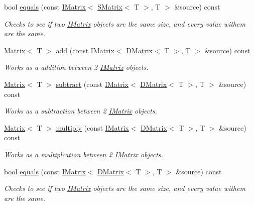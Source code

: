 \begin{DoxyCompactItemize}
bool \mbox{\hyperlink{class_matrix_a10dabe69f447e230871ecc91cbced548}{equals}} (const \mbox{\hyperlink{class_i_matrix}{I\+Matrix}}$<$ \mbox{\hyperlink{class_s_matrix}{S\+Matrix}}$<$ T $>$, T $>$ \&source) const
\begin{DoxyCompactList}\small\item\em Checks to see if two \mbox{\hyperlink{class_i_matrix}{I\+Matrix}} objects are the same size, and every value withem are the same. \end{DoxyCompactList}\item 
\mbox{\hyperlink{class_matrix}{Matrix}}$<$ T $>$ \mbox{\hyperlink{class_matrix_a048e194afecce438b18ceab8b0ff64fc}{add}} (const \mbox{\hyperlink{class_i_matrix}{I\+Matrix}}$<$ \mbox{\hyperlink{class_d_matrix}{D\+Matrix}}$<$ T $>$, T $>$ \&source) const
\begin{DoxyCompactList}\small\item\em Works as a addition between 2 \mbox{\hyperlink{class_i_matrix}{I\+Matrix}} objects. \end{DoxyCompactList}\item 
\mbox{\hyperlink{class_matrix}{Matrix}}$<$ T $>$ \mbox{\hyperlink{class_matrix_a772640d64a7742213fe09c7a9b9c63d3}{subtract}} (const \mbox{\hyperlink{class_i_matrix}{I\+Matrix}}$<$ \mbox{\hyperlink{class_d_matrix}{D\+Matrix}}$<$ T $>$, T $>$ \&source) const
\begin{DoxyCompactList}\small\item\em Works as a subtraction between 2 \mbox{\hyperlink{class_i_matrix}{I\+Matrix}} objects. \end{DoxyCompactList}\item 
\mbox{\hyperlink{class_matrix}{Matrix}}$<$ T $>$ \mbox{\hyperlink{class_matrix_afc5e3f929ee180c1f285999c2338ff0c}{multiply}} (const \mbox{\hyperlink{class_i_matrix}{I\+Matrix}}$<$ \mbox{\hyperlink{class_d_matrix}{D\+Matrix}}$<$ T $>$, T $>$ \&source) const
\begin{DoxyCompactList}\small\item\em Works as a multiplcation between 2 \mbox{\hyperlink{class_i_matrix}{I\+Matrix}} objects. \end{DoxyCompactList}\item 
bool \mbox{\hyperlink{class_matrix_a7fd4b8c603866c4cb516ddfe615373b0}{equals}} (const \mbox{\hyperlink{class_i_matrix}{I\+Matrix}}$<$ \mbox{\hyperlink{class_d_matrix}{D\+Matrix}}$<$ T $>$, T $>$ \&source) const
\begin{DoxyCompactList}\small\item\em Checks to see if two \mbox{\hyperlink{class_i_matrix}{I\+Matrix}} objects are the same size, and every value withem are the same. \end{DoxyCompactList}\end{DoxyCompactItemize}


